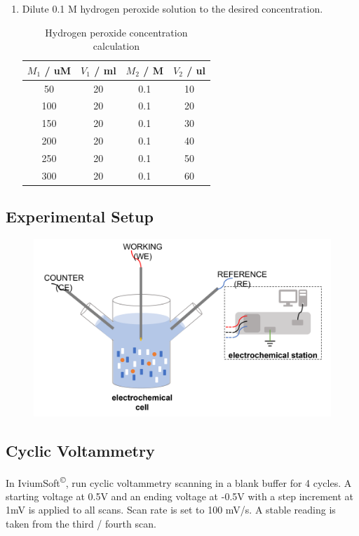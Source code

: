 \begin{appendices}
\begin{enumerate}
    \item Dilute 0.1 M hydrogen peroxide solution to the desired concentration.
    \begin{table}[H]
        \centering
        \begin{tabular}{|c|c|c|c|} \hline
            $M_{1}$ / uM & $V_{1}$ / ml & $M_{2}$ / M & $V_{2}$ / ul \\ \hline
            50  & 20 & 0.1 & 10 \\ \hline
            100 & 20 & 0.1 & 20 \\ \hline
            150 & 20 & 0.1 & 30 \\ \hline
            200 & 20 & 0.1 & 40 \\ \hline
            250 & 20 & 0.1 & 50 \\ \hline
            300 & 20 & 0.1 & 60 \\ \hline
        \end{tabular}
        \caption{Hydrogen peroxide concentration calculation}
        \label{tab:my_label}
    \end{table}
\end{enumerate}

\subsection{Experimental Setup}
\begin{figure}[H]
    \centering
    \includegraphics[width=.6\textwidth]{img/h2o2_setup.png}
\end{figure}

\subsection{Cyclic Voltammetry}
In IviumSoft\textsuperscript{\copyright}, run cyclic voltammetry  scanning in a blank buffer for 4 cycles. A starting voltage at 0.5V and an ending voltage at -0.5V  with a step increment at 1mV is applied to all scans. Scan rate is set to 100 mV/s. A stable reading is taken from the third / fourth scan. 


\end{appendices}
